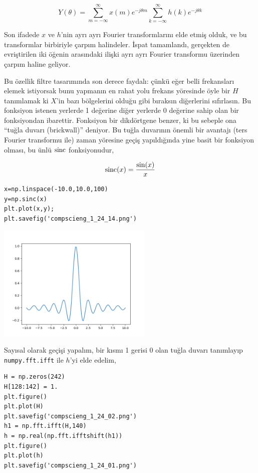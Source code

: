 \documentclass[12pt,fleqn]{article}\usepackage{../../common}
\begin{document}
$$ 
Y(\theta) =
\sum_{m=-\infty}^{\infty} x(m)  e^{-j\theta m}
\sum_{k=-\infty}^{\infty} h(k)  e^{-j\theta k}
$$

Son ifadede $x$ ve $h$'nin ayrı ayrı Fourier transformlarını elde etmiş
olduk, ve bu transformlar birbiriyle çarpım halindeler. İspat tamamlandı,
gerçekten de evriştirilen iki öğenin arasındaki ilişki ayrı ayrı Fourier
transformu üzerinden çarpım haline geliyor.

Bu özellik filtre tasarımında son derece faydalı: çünkü eğer belli
frekansları elemek istiyorsak bunu yapmanın en rahat yolu frekans yöresinde
öyle bir $H$ tanımlamak ki $X$'in bazı bölgelerini olduğu gibi bıraksın
diğerlerini sıfırlasın. Bu fonksiyon istenen yerlerde 1 değerine diğer
yerlerde 0 değerine sahip olan bir fonksiyondan ibarettir. Fonksiyon bir
dikdörtgene benzer, ki bu sebeple ona ``tuğla duvarı (brickwall)''
deniyor. Bu tuğla duvarının önemli bir avantajı (ters Fourier transformu
ile) zaman yöresine geçiş yapıldığında yine basit bir fonksiyon olması, bu
ünlü $\operatorname{sinc}$ fonksiyonudur,

$$ \operatorname{sinc} (x) = \frac{\sin(x)}{x}$$

\begin{verbatim}
x=np.linspace(-10.0,10.0,100)
y=np.sinc(x)
plt.plot(x,y); 
plt.savefig('compscieng_1_24_14.png')
\end{verbatim}

\includegraphics[width=20em]{compscieng_1_24_14.png}

Sayısal olarak geçişi yapalım, bir kısmı 1 gerisi 0 olan tuğla duvarı
tanımlayıp \verb!numpy.fft.ifft! ile $h$'yi elde edelim,

\begin{verbatim}
H = np.zeros(242)
H[128:142] = 1.
plt.figure()
plt.plot(H)
plt.savefig('compscieng_1_24_02.png')
h1 = np.fft.ifft(H,140)
h = np.real(np.fft.ifftshift(h1))
plt.figure()
plt.plot(h)
plt.savefig('compscieng_1_24_01.png')
\end{verbatim}
\end{document}
